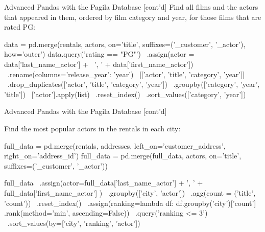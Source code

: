 \documentclass[ignorenonframetext,xcolor=x11names]{beamer}
\begin{document}
\begin{frame}[fragile]{Advanced Pandas with the Pagila Database  \small [cont'd]}
Find all films and the actors that appeared in them, ordered by film category and year, for those films that are rated PG:

\scriptsize
\begin{pythoncode}
data = pd.merge(rentals, actors, on='title', 
         suffixes=('_customer', '_actor'), how='outer')
data.query('rating == "PG"') \
    .assign(actor = data['last_name_actor'] + \
                   ', ' + data['first_name_actor']) \
    .rename(columns={'release_year': 'year'}) \
    [['actor', 'title', 'category', 'year']] \
    .drop_duplicates(['actor', 'title', 'category', 'year']) \
    .groupby(['category', 'year', 'title']) \
    ['actor'].apply(list) \
    .reset_index() \
    .sort_values(['category', 'year']) \
\end{pythoncode}
\end{frame}


\begin{frame}[fragile]{Advanced Pandas with the Pagila Database \small [cont'd]}

Find the most popular actors in the rentals in each city:

\scriptsize
\begin{pythoncode}
full_data = pd.merge(rentals, addresses, 
                     left_on='customer_address', 
                     right_on='address_id')
full_data = pd.merge(full_data, actors, on='title', 
                     suffixes=('_customer', '_actor'))
\end{pythoncode}

\begin{pythoncode}
full_data \
   .assign(actor=full_data['last_name_actor'] + ', ' + 
                 full_data['first_name_actor'] ) \
   .groupby(['city', 'actor']) \
   .agg(count = ('title', 'count')) \
   .reset_index() \
   .assign(ranking=lambda df: 
      df.groupby('city')['count']
        .rank(method='min', ascending=False)) \
   .query('ranking <= 3') \
   .sort_values(by=['city', 'ranking', 'actor'])
\end{pythoncode}

\end{frame}
\end{document}
